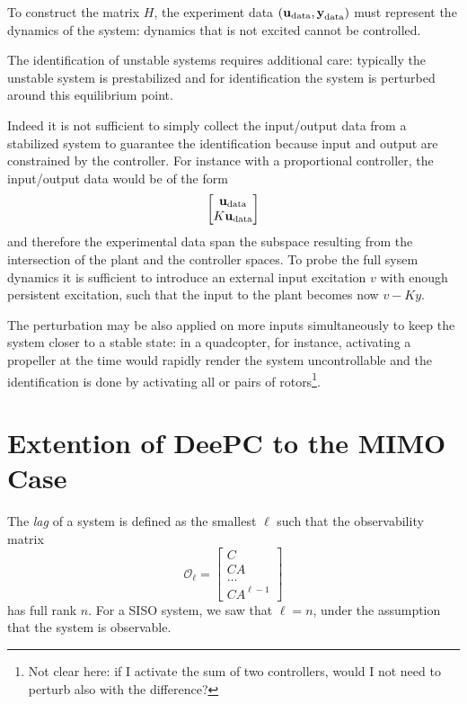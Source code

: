 To construct the matrix $H$, the experiment data $(\boldsymbol{\mathrm{u}}_\textrm{data},\boldsymbol{\mathrm{y}}_\textrm{data})$ must represent the dynamics of the system: dynamics that is not excited cannot be controlled.

The identification of unstable systems requires additional care: typically the unstable system is prestabilized and for identification the system is perturbed around this equilibrium point.

Indeed it is not sufficient to simply collect the input/output data from a stabilized system to guarantee the identification because input and output are constrained by the controller. For instance with a proportional controller, the input/output data would be of the form
\begin{equation*}
  \begin{bmatrix}
    \boldsymbol{\mathrm{u}}_\textrm{data} \\ K\boldsymbol{\mathrm{u}}_\textrm{data}
  \end{bmatrix}
\end{equation*}
and therefore the experimental data span the subspace resulting from the intersection of the plant and the controller spaces. To probe the full sysem dynamics it is sufficient to introduce an external input excitation $v$ with enough persistent excitation, such that the input to the plant becomes now $v - Ky$.

The perturbation may be also applied on more inputs simultaneously to keep the system closer to a stable state: in a quadcopter, for instance, activating a propeller at the time would rapidly render the system uncontrollable and the identification is done by activating all or pairs of rotors\footnote{Not clear here: if I activate the sum of two controllers, would I not need to perturb also with the difference?}.


\section{Extention of DeePC to the MIMO Case}

The \emph{lag} of a system is defined as the smallest $\ell$ such that the observability matrix
\begin{equation*}
  \mathcal{O}_\ell =
  \begin{bmatrix}
    C \\ CA \\ \ldots \\ CA^{\ell-1}
  \end{bmatrix}
\end{equation*}
has full rank $n$. For a SISO system, we saw that $\ell=n$, under the assumption that the system is observable.

